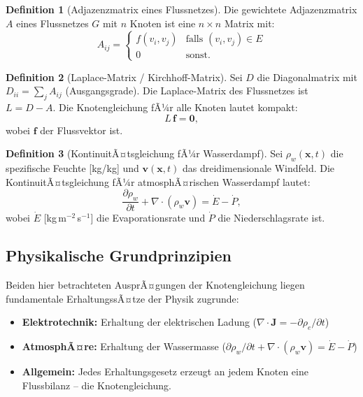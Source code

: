 ﻿\documentclass[a4paper,12pt]{article}
\theoremstyle{definition}
\newtheorem{definition}{Definition}
\begin{document}
\begin{definition}[Adjazenzmatrix eines Flussnetzes]
  Die gewichtete Adjazenzmatrix $A$ eines Flussnetzes $G$ mit $n$ Knoten ist
  eine $n \times n$ Matrix mit:
  \[
    A_{ij} = \begin{cases} f(v_i, v_j) & \text{falls } (v_i, v_j) \in E \\ 0 & \text{sonst.} \end{cases}
  \]
\end{definition}

\begin{definition}[Laplace-Matrix / Kirchhoff-Matrix]
  Sei $D$ die Diagonalmatrix mit $D_{ii} = \sum_j A_{ij}$ (Ausgangsgrade).
  Die Laplace-Matrix des Flussnetzes ist $L = D - A$. Die Knotengleichung
  fÃ¼r alle Knoten lautet kompakt:
  \[
    L \,\mathbf{f} = \mathbf{0},
  \]
  wobei $\mathbf{f}$ der Flussvektor ist.
\end{definition}

\begin{definition}[KontinuitÃ¤tsgleichung fÃ¼r Wasserdampf]
  Sei $\rho_w(\mathbf{x}, t)$ die spezifische Feuchte [kg/kg] und
  $\mathbf{v}(\mathbf{x}, t)$ das dreidimensionale Windfeld. Die
  KontinuitÃ¤tsgleichung fÃ¼r atmosphÃ¤rischen Wasserdampf lautet:
  \[
    \frac{\partial \rho_w}{\partial t} + \nabla \cdot (\rho_w \mathbf{v})
    = \dot{E} - \dot{P},
  \]
  wobei $\dot{E}$ [kg\,m$^{-2}$\,s$^{-1}$] die Evaporationsrate und
  $\dot{P}$ die Niederschlagsrate ist.
\end{definition}

\subsection{Physikalische Grundprinzipien}

Beiden hier betrachteten AusprÃ¤gungen der Knotengleichung liegen
fundamentale ErhaltungssÃ¤tze der Physik zugrunde:

\begin{itemize}
  \item \textbf{Elektrotechnik:} Erhaltung der elektrischen Ladung
    ($\nabla \cdot \mathbf{J} = -\partial\rho_e/\partial t$)
  \item \textbf{AtmosphÃ¤re:} Erhaltung der Wassermasse
    ($\partial\rho_w/\partial t + \nabla \cdot (\rho_w \mathbf{v}) = \dot{E} - \dot{P}$)
  \item \textbf{Allgemein:} Jedes Erhaltungsgesetz erzeugt an jedem Knoten
    eine Flussbilanz -- die Knotengleichung.
\end{itemize}
\end{document}
